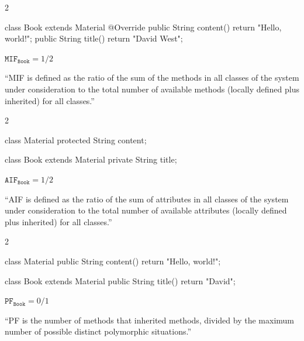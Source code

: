 \documentclass{article}
\begin{document}
\begin{multicols}{2}
{\small\begin{ffcode}
class Book extends Material {
  @Override
  public String content() {
    return "Hello, world!";
  }
  public String title() {
    return "David West";
  }
}
\end{ffcode}
}
\par\columnbreak\par
\(\texttt{MIF}_\texttt{Book} = 1/2\)\par
``MIF is defined as the ratio of the sum of the  methods in all classes of
the system under consideration to the total number of available methods
(locally defined plus inherited) for all classes.''
\end{multicols}
\plush{}

\begin{multicols}{2}
{\small\begin{ffcode}
class Material {
  protected String content;
}

class Book extends Material {
  private String title;
}
\end{ffcode}
}
\par\columnbreak\par
\(\texttt{AIF}_\texttt{Book} = 1/2\)\par
``AIF is defined as the ratio of the sum of  attributes in all classes of
the system under consideration to the total number of available attributes
(locally defined plus inherited) for all classes.''
\end{multicols}
\plush{}

\begin{multicols}{2}
{\small\begin{ffcode}
class Material {
  public String content() {
    return "Hello, world!";
  }
}

class Book extends Material {
  public String title() {
    return "David";
  }
}
\end{ffcode}
}
\par\columnbreak\par
\(\texttt{PF}_\texttt{Book} = 0/1\)\par
``PF is the number of methods that  inherited methods, divided by the
maximum number of possible distinct polymorphic situations.''
\end{multicols}
\plush{}
\end{document}

